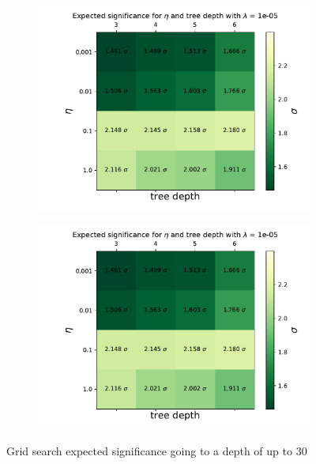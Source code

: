 \documentclass[14pt, a4paper]{book}
\begin{document}
\begin{figure}[!ht]
	\centering
	\begin{subfigure}[b]{0.49\textwidth}
      \centering
      \includegraphics[width=1\textwidth]{Expected_significance.pdf}
   \end{subfigure}
   \hfill\graphicspath{{../../../Plots/XGBoost/FULL/GRIDSEARCH_24-30}}
   \begin{subfigure}[b]{0.49\textwidth}
      \centering
      \includegraphics[width=1\textwidth]{Expected_significance.pdf}
   \end{subfigure}
   \caption{Grid search expected significance going to a depth of up to 30}\label{fig:BDT_deep_sig}
\end{figure}
\end{document}
